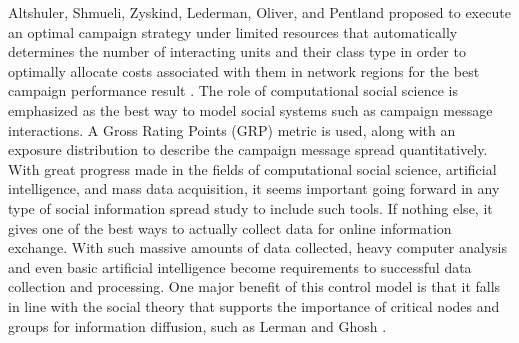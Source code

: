 Altshuler, Shmueli, Zyskind, Lederman, Oliver, and Pentland proposed to execute an optimal campaign strategy under limited resources that automatically determines the number of interacting units and their class type in order to optimally allocate costs associated with them in network regions for the best campaign performance result \cite{altshuler2014campaign}. The role of computational social science is emphasized as the best way to model social systems such as campaign message interactions. A Gross Rating Points (GRP) metric is used, along with an exposure distribution to describe the campaign message spread quantitatively. With great progress made in the fields of computational social science, artificial intelligence, and mass data acquisition, it seems important going forward in any type of social information spread study to include such tools. If nothing else, it gives one of the best ways to actually collect data for online information exchange. With such massive amounts of data collected, heavy computer analysis and even basic artificial intelligence become requirements to successful data collection and processing. One major benefit of this control model is that it falls in line with the social theory that supports the importance of critical nodes and groups for information diffusion, such as Lerman and Ghosh \cite{lerman2010information}.